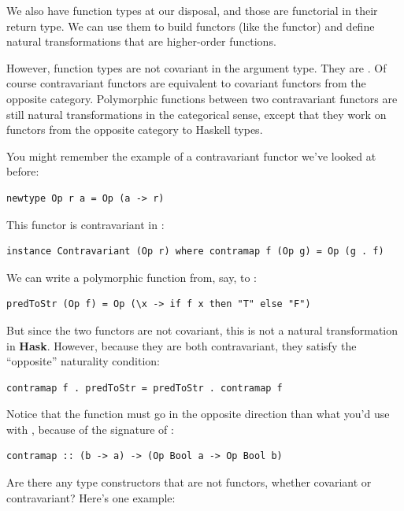 We also have function types at our disposal, and those are functorial in
their return type. We can use them to build functors (like the
 functor) and define natural transformations that are
higher-order functions.

However, function types are not covariant in the argument type. They are
. Of course contravariant functors are equivalent to
covariant functors from the opposite category. Polymorphic functions
between two contravariant functors are still natural transformations in
the categorical sense, except that they work on functors from the
opposite category to Haskell types.

You might remember the example of a contravariant functor we've looked
at before:

\begin{verbatim}
newtype Op r a = Op (a -> r)
\end{verbatim}

This functor is contravariant in :

\begin{verbatim}
instance Contravariant (Op r) where contramap f (Op g) = Op (g . f)
\end{verbatim}

We can write a polymorphic function from, say,  to
:

\begin{verbatim}
predToStr (Op f) = Op (\x -> if f x then "T" else "F")
\end{verbatim}

But since the two functors are not covariant, this is not a natural
transformation in \textbf{Hask}. However, because they are both
contravariant, they satisfy the ``opposite'' naturality condition:

\begin{verbatim}
contramap f . predToStr = predToStr . contramap f
\end{verbatim}

Notice that the function  must go in the opposite direction
than what you'd use with , because of the signature of
:

\begin{verbatim}
contramap :: (b -> a) -> (Op Bool a -> Op Bool b)
\end{verbatim}

Are there any type constructors that are not functors, whether covariant
or contravariant? Here's one example:

